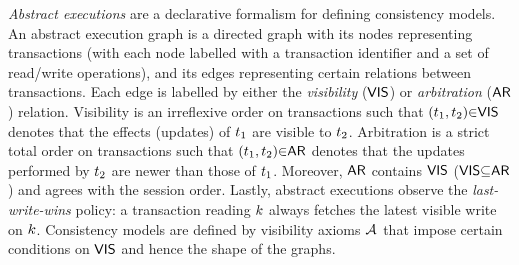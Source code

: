 

\emph{Abstract executions} \cite{ev_transactions,framework-concur} are a declarative formalism for defining consistency models. 
An abstract execution graph is a directed graph with its nodes representing transactions 
(with each node labelled with a transaction identifier and a set of read/write operations), 
and its edges representing certain relations between transactions. 
Each edge is labelled by either the \emph{visibility} ($\mathsf{VIS}$) or \emph{arbitration} ($\mathsf{AR}$) relation. 
Visibility is an irreflexive order on transactions such that $(t_1,t_2) {\in} \mathsf{VIS}$ denotes that the effects (updates) of $t_1$ are visible to $t_2$. 
Arbitration is a strict total order on transactions such that $(t_1,t_2) {\in} \mathsf{AR}$ denotes that the updates performed by $t_2$ are newer than those of $t_1$. 
Moreover, $\mathsf{AR}$ contains $\mathsf{VIS}$ ($\mathsf{VIS} {\subseteq} \mathsf{AR}$) and agrees with the session order.
Lastly, abstract executions observe the \emph{last-write-wins} policy: 
a transaction reading $k$ always fetches the latest visible write on $k$.
Consistency models are defined by visibility axioms \( \visaxioms\) 
that impose certain conditions on $\mathsf{VIS}$ and hence the shape of the graphs.


